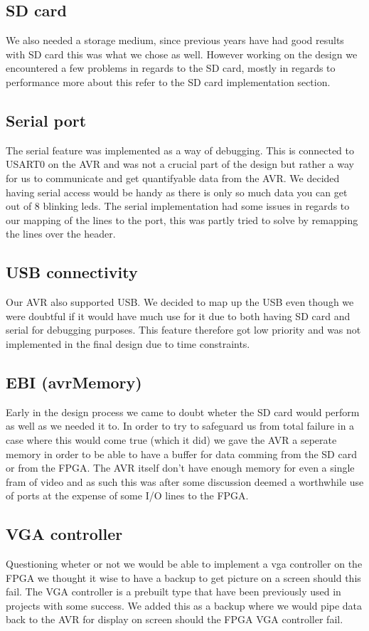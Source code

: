 \subsection{SD card}

We also needed a storage medium, since previous years have had good results with SD card this was what we chose as well. However working on the design we encountered a few problems in regards to the SD card, mostly in regards to performance more about this refer to the SD card implementation section.

\subsection{Serial port}

The serial feature was implemented as a way of debugging. This is connected to USART0 on the AVR and was not a crucial part of the design but rather a way for us to communicate and get quantifyable data from the AVR. We decided having serial access would be handy as there is only so much data you can get out of 8 blinking leds. The serial implementation had some issues in regards to our mapping of the lines to the port, this was partly tried to solve by remapping the lines over the header.

\subsection{USB connectivity}

Our AVR also supported USB. We decided to map up the USB even though we were doubtful if it would have much use for it due to both having SD card and serial for debugging purposes. This feature therefore got low priority and was not implemented in the final design due to time constraints.
 


\subsection{EBI (avrMemory)}

Early in the design process we came to doubt wheter the SD card would perform as well as we needed it to. In order to try to safeguard us from total failure in a case where this would come true (which it did) we gave the AVR a seperate memory in order to be able to have a buffer for data comming from the SD card or from the FPGA. The AVR itself don't have enough memory for even a single fram of video and as such this was after some discussion deemed a worthwhile use of ports at the expense of some I/O lines to the FPGA.


\subsection{VGA controller}

Questioning wheter or not we would be able to implement a vga controller on the FPGA we thought it wise to have a backup to get picture on a screen should this fail. The VGA controller is a prebuilt type that have been previously used in projects with some success. We added this as a backup where we would pipe data back to the AVR for display on screen should the FPGA VGA controller fail.


